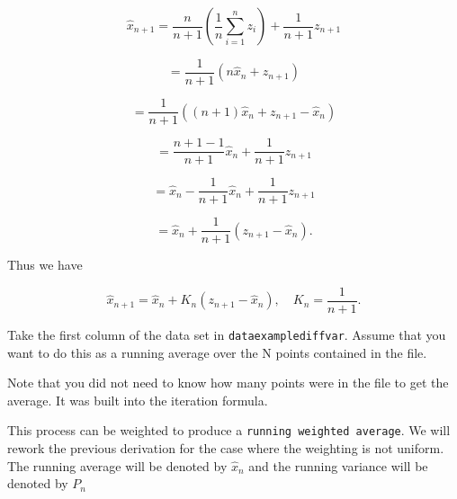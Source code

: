\[\hat{x}_{n+1} = \displaystyle \frac{n}{n+1}\left(\frac{1}{n}\sum_{i=1}^{n} z_i\right) + \frac{1}{n+1}z_{n+1}\]

\[= \displaystyle \frac{1}{n+1}\left( n\hat{x}_n + z_{n+1}\right)\]

\[= \displaystyle \frac{1}{n+1}\left( (n+1)\hat{x}_n + z_{n+1} - \hat{x}_n\right)\]

\[= \displaystyle \frac{n+1-1}{n+1}\hat{x}_n + \frac{1}{n+1}z_{n+1}\]

\[=  \displaystyle \hat{x}_n - \frac{1}{n+1}\hat{x}_n + \frac{1}{n+1}z_{n+1}\]

\[= \displaystyle \hat{x}_n  + \frac{1}{n+1}\left( z_{n+1}-\hat{x}_n\right) .\]

Thus we have

\[\hat{x}_{n+1} = \hat{x}_n + K_n\left( z_{n+1} - \hat{x}_n\right), \quad K_n = \displaystyle \frac{1}{n+1} .\]

Take the first column of the data set in \texttt{dataexamplediffvar}.
Assume that you want to do this as a running average over the N points
contained in the file.

\begin{Shaded}
\begin{Highlighting}[]
\OperatorTok{=} 
\OperatorTok{=} 

\OperatorTok{=} \NormalTok{(}\OperatorTok{,}\NormalTok{)}
 \OperatorTok{!}
   \OperatorTok{,}
\OperatorTok{=}
\OperatorTok{=}\OperatorTok{,}\NormalTok{items[}\NormalTok{])}
\OperatorTok{=}\OperatorTok{+}\OperatorTok{{-}}\OperatorTok{/}
\OperatorTok{=}\OperatorTok{+}

\OperatorTok{,}
\end{Highlighting}
\end{Shaded}

Note that you did not need to know how many points were in the file to
get the average. It was built into the iteration formula.

This process can be weighted to produce a
\texttt{running\ weighted\ average}. We will rework the previous
derivation for the case where the weighting is not uniform. The running
average will be denoted by \(\hat{x}_n\) and the running variance will
be denoted by \(P_n\)

